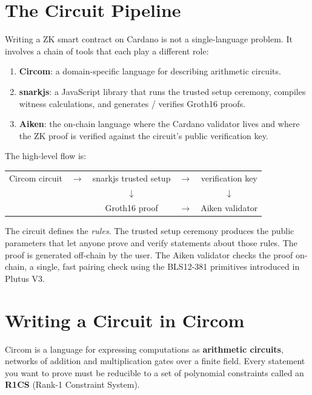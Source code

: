 \section{The Circuit Pipeline} \label{sec:circuit-pipeline}

Writing a ZK smart contract on Cardano is not a single-language problem. It involves a chain of tools that each play a different role:

\begin{enumerate}
  \item \textbf{Circom}: a domain-specific language for describing arithmetic circuits.
  \item \textbf{snarkjs}: a JavaScript library that runs the trusted setup ceremony, compiles witness calculations, and generates / verifies Groth16 proofs.
  \item \textbf{Aiken}: the on-chain language where the Cardano validator lives and where the ZK proof is verified against the circuit's public verification key.
\end{enumerate}

The high-level flow is:

\begin{center}
\begin{tabular}{ccccc}
  Circom circuit & $\longrightarrow$ & snarkjs trusted setup & $\longrightarrow$ & verification key \\
  & & $\downarrow$ & & $\downarrow$ \\
  & & Groth16 proof & $\longrightarrow$ & Aiken validator
\end{tabular}
\end{center}

The circuit defines the \emph{rules}. The trusted setup ceremony produces the public parameters that let anyone prove and verify statements about those rules. The proof is generated off-chain by the user. The Aiken validator checks the proof on-chain, a single, fast pairing check using the BLS12-381 primitives introduced in Plutus V3.

\section{Writing a Circuit in Circom} \label{sec:circom}

Circom is a language for expressing computations as \textbf{arithmetic circuits}, networks of addition and multiplication gates over a finite field. Every statement you want to prove must be reducible to a set of polynomial constraints called an \textbf{R1CS} (Rank-1 Constraint System).

